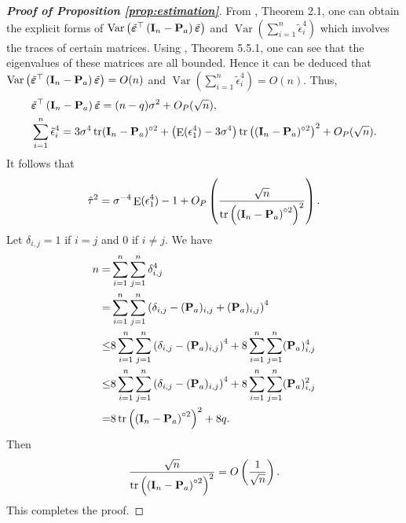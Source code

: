 \documentclass[11pt]{article}
\DeclareMathOperator{\mytr}{tr}
\DeclareMathOperator{\myE}{E}
\DeclareMathOperator{\myVar}{Var}
\theoremstyle{plain}
\theoremstyle{definition}
\theoremstyle{remark}
\begin{document}
\begin{appendices}
\begin{proof}[\textbf{Proof of Proposition \ref{prop:estimation}}]
    From \cite{Bai2017}, Theorem 2.1, one can obtain the explicit forms of $\myVar \left( \tilde \bepsilon^\top \left( \BI_n-\BP_a \right) \tilde \bepsilon  \right)$ and $\myVar \left( \sum_{i=1}^n \tilde \epsilon_i^4 \right)$ which involves the traces of certain matrices.
    Using \cite{book:1244195}, Theorem 5.5.1, one can see that the eigenvalues of these matrices are all bounded.
    Hence it can be deduced that $\myVar \left( \tilde \bepsilon^\top \left( \BI_n-\BP_a \right) \tilde \bepsilon  \right)=O(n)$ and $\myVar \left( \sum_{i=1}^n \tilde \epsilon_i^4 \right)=O(n)$.
    Thus,
    \begin{align*}
        & \tilde \bepsilon^\top \left( \BI_n-\BP_a \right) \tilde \bepsilon
        = (n-q) \sigma^2+O_P(\sqrt n),
        \\
        & \sum_{i=1}^n \tilde \epsilon_i^4 
        =
        3\sigma^4 \mytr (\BI_n-\BP_a)^{\circ 2} 
        +\left( \myE (\epsilon_1^4)-3 \sigma^{4}\right)
        \mytr \left( (\BI_n-\BP_a)^{\circ 2}  \right)^2 + O_P(\sqrt n).
    \end{align*}
    It follows that
    \begin{equation*}
        \hat \tau ^2 = \sigma^{-4}\myE (\epsilon_1^4)-1
        +O_P\left( \frac{\sqrt n}{\mytr \left( \left(  \BI_n - \BP_a \right)^{\circ 2} \right)^2} \right).
    \end{equation*}
    Let $\delta_{i,j}=1$ if $i=j$ and $0$ if $i\neq j$.
    We have
    \begin{equation*}
        \begin{split}
        n=&
        \sum_{i=1}^n \sum_{j=1}^n \delta_{i,j}^4 
        \\
        =&
        \sum_{i=1}^n \sum_{j=1}^n \left( \delta_{i,j}-(\BP_{a})_{i,j}+(\BP_{a})_{i,j} \right)^4 
        \\
        \leq&
    8\sum_{i=1}^n \sum_{j=1}^n \left( \delta_{i,j}-(\BP_{a})_{i,j}\right)^4+
    8\sum_{i=1}^n \sum_{j=1}^n(\BP_{a})_{i,j}^4
        \\
        \leq&
    8\sum_{i=1}^n \sum_{j=1}^n \left( \delta_{i,j}-(\BP_{a})_{i,j}\right)^4+
    8\sum_{i=1}^n \sum_{j=1}^n(\BP_{a})_{i,j}^2
    \\
    =&
        8\mytr \left( \left(  \BI_n - \BP_a \right)^{\circ 2} \right)^2
        +8q.
        \end{split}
    \end{equation*}
    Then
    \begin{equation*}
        \frac{\sqrt n}{\mytr \left( \left(  \BI_n - \BP_a \right)^{\circ 2} \right)^2} 
        =
        O\left( \frac{1}{\sqrt n} \right).
    \end{equation*}
    This completes the proof.
\end{proof}



\end{appendices}
\end{document}
